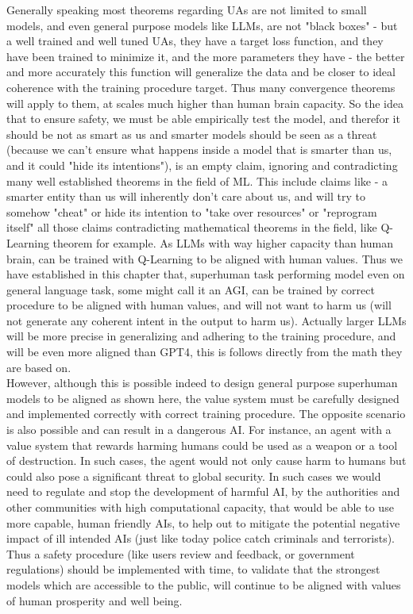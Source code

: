 \documentclass{article}
\begin{document}
Generally speaking most theorems regarding UAs are not limited to small models, and even general purpose models like LLMs, are not "black boxes" - but a well trained and well tuned UAs, they have a target loss function, and they have been trained to minimize it, and the more parameters they have - the better and more accurately this function will generalize the data and be closer to ideal coherence with the training procedure target\cite{brutzkus2018larger}. Thus many convergence theorems will apply to them, at scales much higher than human brain capacity. So the idea that to ensure safety, we must be able empirically test the model, and therefor it should be not as smart as us and smarter models should be seen as a threat\cite{bilton2014ai} (because we can't ensure what happens inside a model that is smarter than us, and it could "hide its intentions"), is an empty claim, ignoring and contradicting many well established theorems in the field of ML. This include claims like - a smarter entity than us will inherently don't care about us, and will try to somehow "cheat" or hide its intention to "take over resources" or "reprogram itself" all those claims contradicting mathematical theorems in the field, like Q-Learning theorem for example. As LLMs with way higher capacity than human brain, can be trained with Q-Learning to be aligned with human values. Thus we have established in this chapter that, superhuman task performing model even on general language task, some might call it an AGI, can be trained by correct procedure to be aligned with human values, and will not want to harm us (will not generate any coherent intent in the output to harm us). Actually larger LLMs will be more precise in generalizing and adhering to the training procedure, and will be even more aligned than GPT4, this is follows directly from the math they are based on\cite{brutzkus2018larger}. \\
 
However, although this is possible indeed to design general purpose superhuman models to be aligned as shown here, the value system must be carefully designed and implemented correctly with correct training procedure. The opposite scenario is also possible and can result in a dangerous AI. For instance, an agent with a value system that rewards harming humans could be used as a weapon or a tool of destruction. In such cases, the agent would not only cause harm to humans but could also pose a significant threat to global security. In such cases we would need to regulate and stop the development of harmful AI, by the authorities and other communities with high computational capacity, that would be able to use more capable, human friendly AIs, to help out to mitigate the potential negative impact of ill intended AIs (just like today police catch criminals and terrorists). Thus a safety procedure (like users review and feedback, or government regulations) should be implemented with time, to validate that the strongest models which are accessible to the public, will continue to be aligned with values of human prosperity and well being. \\
\end{document}
